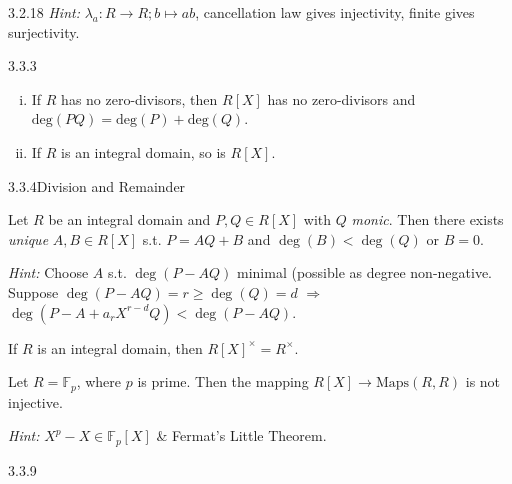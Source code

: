 \documentclass[10pt]{article} %
\renewcommand{\geq}{\geqslant}
\newcommand{\Hint}{\vspace{0.2em}\textit{Hint: }}
\begin{document}
\begin{multicols}{3}
\begin{theorem}{3.2.18}{}
    \Hint $\lambda_a: R \to R; b \mapsto ab$, cancellation law gives injectivity, finite gives surjectivity.

\end{theorem}

\begin{lemma}{3.3.3}{}

    \begin{enumerate}[(i)]
        \item If $R$ has no zero-divisors, then $R[X]$ has no zero-divisors and $\mathrm{deg}(PQ) = \mathrm{deg}(P) + \mathrm{deg}(Q)$.
        \item If $R$ is an integral domain, so is $R[X]$.
    \end{enumerate}

\end{lemma}

\begin{theorem}{3.3.4}{Division and Remainder}

    Let $R$ be an integral domain and $P,Q \in R[X]$ with $Q$ \emph{monic}. Then there exists \emph{unique} $A,B \in R[X]$ s.t. $P = AQ + B$ and $\deg(B) < \deg(Q)$ or $B = 0$.

    \Hint Choose $A$ s.t. $\deg(P - AQ)$ minimal (possible as degree non-negative. Suppose $\deg(P - AQ) = r \geq \deg(Q) = d$ $\Rightarrow$ $\deg(P - A + a_rX^{r-d}Q) < \deg(P - AQ)$.

\end{theorem}

\begin{exercise}{42}{}

    If $R$ is an integral domain, then $R[X]^{\times} = R^{\times}$.

\end{exercise}

\begin{exercise}{43}{}

    Let $R=\mathbb{F}_p$, where $p$ is prime. Then the mapping $R[X] \to \mathrm{Maps}(R,R)$ is not injective.

    \Hint $X^p - X \in \mathbb{F}_p[X]$ \& Fermat's Little Theorem.

\end{exercise}

\begin{proposition}{3.3.9}{}


\end{proposition}
\end{multicols}
\end{document}
